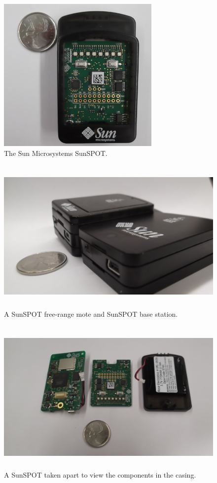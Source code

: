 	 \begin{figure}[htbp]
	 	\centering
	 		\includegraphics[height=3in]{images/motes/sunspot1.jpg}
	 	\caption{The Sun Microsystems SunSPOT.}
	 	\label{fig:images_motes_sunspot1}
	 \end{figure}
	\begin{figure}[htbp]
	 	\centering
	 		\includegraphics[height=3in]{images/motes/spotBSandMote.jpg}
	 	\caption{A SunSPOT free-range mote and SunSPOT base station.}
	 	\label{fig:images_motes_sunspotandBS}
	 \end{figure}
	 \begin{figure}[htbp]
	 	\centering
	 		\includegraphics[height=3in]{images/motes/sunspot2.jpg}
	 	\caption{A SunSPOT taken apart to view the components in the casing.}
	 	\label{fig:images_motes_sunspot2}
	 \end{figure}
 
